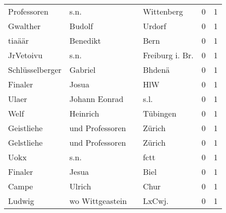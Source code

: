 \begin{tabular}{llllrr}
              Professoren &                               s.n. &             &                                  Wittenberg &          0 &         1 \\
                 Gwalther &                             Budolf &             &                                      Urdorf &          0 &         1 \\
                   tiaäär &                           Benedikt &             &                                        Bern &          0 &         1 \\
                JrVetoivu &                               s.n. &             &                            Freiburg i. Br.  &          0 &         1 \\
          Schlüsselberger &                            Gabriel &             &                                      Bhdenä &          0 &         1 \\
                  Finaler &                              Josua &             &                                         HlW &          0 &         1 \\
                    Ulaer &                      Johann Eonrad &             &                                        s.l. &          0 &         1 \\
                     Welf &                           Heinrich &             &                                    Tübingen &          0 &         1 \\
               Geistliehe &                    und Professoren &             &                                      Zürich &          0 &         1 \\
               Gelstliehe &                    und Professoren &             &                                      Zürich &          0 &         1 \\
                     Uokx &                               s.n. &             &                                        fctt &          0 &         1 \\
                  Finaler &                              Jesua &             &                                        Biel &          0 &         1 \\
                    Campe &                             Ulrich &             &                                        Chur &          0 &         1 \\
                   Ludwig &                    wo Wittgeastein &             &                                     LxCwj.  &          0 &         1 \\

\end{tabular}
